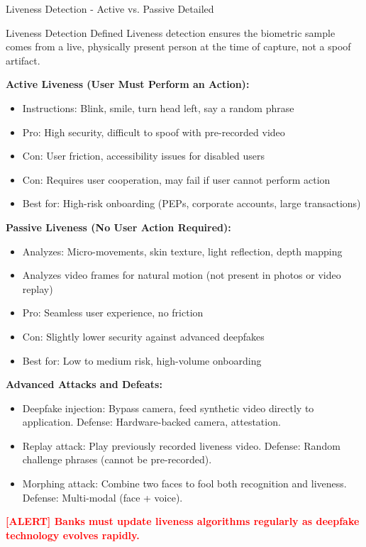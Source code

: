 \documentclass[11pt,a4paper]{beamer}
\newcommand{\redflag}[1]{\textcolor{red}{\textbf{[ALERT] #1}}}
\begin{document}
	\begin{frame}{Liveness Detection - Active vs. Passive Detailed}
		\begin{block}{Liveness Detection Defined}
			Liveness detection ensures the biometric sample comes from a live, physically present person at the time of capture, not a spoof artifact.
		\end{block}
		
		\textbf{Active Liveness (User Must Perform an Action):}
		\begin{itemize}
			\item Instructions: Blink, smile, turn head left, say a random phrase
			\item Pro: High security, difficult to spoof with pre-recorded video
			\item Con: User friction, accessibility issues for disabled users
			\item Con: Requires user cooperation, may fail if user cannot perform action
			\item Best for: High-risk onboarding (PEPs, corporate accounts, large transactions)
		\end{itemize}
		
		\textbf{Passive Liveness (No User Action Required):}
		\begin{itemize}
			\item Analyzes: Micro-movements, skin texture, light reflection, depth mapping
			\item Analyzes video frames for natural motion (not present in photos or video replay)
			\item Pro: Seamless user experience, no friction
			\item Con: Slightly lower security against advanced deepfakes
			\item Best for: Low to medium risk, high-volume onboarding
		\end{itemize}
		
		\textbf{Advanced Attacks and Defeats:}
		\begin{itemize}
			\item Deepfake injection: Bypass camera, feed synthetic video directly to application. Defense: Hardware-backed camera, attestation.
			\item Replay attack: Play previously recorded liveness video. Defense: Random challenge phrases (cannot be pre-recorded).
			\item Morphing attack: Combine two faces to fool both recognition and liveness. Defense: Multi-modal (face + voice).
		\end{itemize}
		
		\redflag{Banks must update liveness algorithms regularly as deepfake technology evolves rapidly.}
	\end{frame}
	
\end{document}
